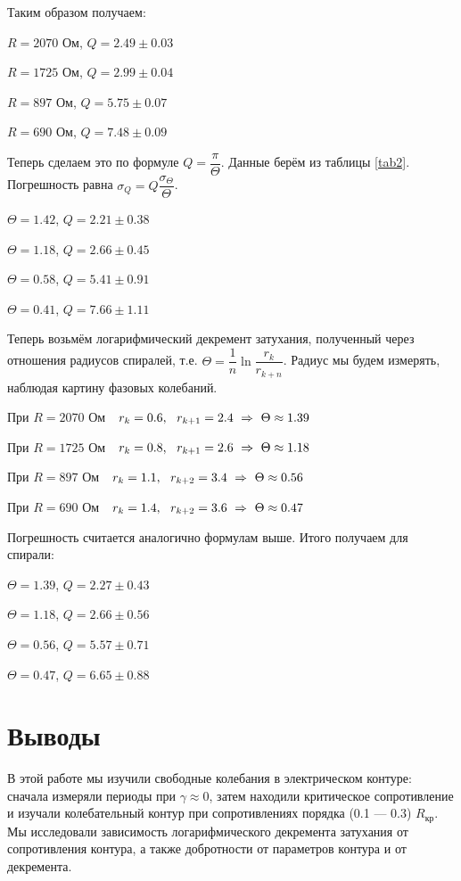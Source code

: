 \documentclass[a4paper,14pt]{article}
\begin{document}
Таким образом получаем:

\begin{center}
	$R = 2070$ Ом, \qquad $Q = 2.49 \pm 0.03$
	
	$R = 1725$ Ом, \qquad $Q = 2.99 \pm 0.04$
	
	$R = 897$ Ом, \qquad $Q = 5.75 \pm 0.07$
	
	$R = 690$ Ом, \qquad $Q = 7.48 \pm 0.09$
\end{center}

Теперь сделаем это по формуле $Q = \dfrac{\pi}{\Theta}$. Данные берём из таблицы \ref{tab2}. Погрешность равна $ \sigma_Q = Q \dfrac{\sigma_\Theta}{\Theta} $. 

\begin{center}
	$\Theta = 1.42$, \qquad $Q = 2.21 \pm 0.38$
	
	$\Theta = 1.18$, \qquad $Q = 2.66 \pm 0.45$
	
	$\Theta = 0.58$, \qquad $Q = 5.41 \pm 0.91$
	
	$\Theta = 0.41$, \qquad $Q = 7.66 \pm 1.11$
\end{center}


Теперь возьмём логарифмический декремент затухания, полученный через отношения радиусов спиралей, т.е. $ \Theta =  \dfrac{1}{n} \ln \dfrac{r_k}{r_{k+n}}$. Радиус мы будем измерять, наблюдая картину фазовых колебаний.

При $ R = 2070  $ Ом $ \ \ r_k = 0.6, \ \ r_{k+1} = 2.4 \ \Ra \ \Theta \approx 1.39$ 

При $ R = 1725  $ Ом $ \ \ r_k = 0.8, \ \ r_{k+1} = 2.6 \ \Ra \ \Theta \approx 1.18$ 

При $ R = 897  $ Ом $ \ \ r_k = 1.1, \ \ r_{k+2} = 3.4 \ \Ra \ \Theta \approx 0.56$ 

При $ R = 690  $ Ом $ \ \ r_k = 1.4, \ \ r_{k+2} = 3.6 \ \Ra \ \Theta \approx 0.47$ 

Погрешность считается аналогично формулам выше. Итого получаем для спирали:

\begin{center}
	$\Theta = 1.39$, \qquad $Q = 2.27 \pm 0.43$
	
	$\Theta = 1.18$, \qquad $Q = 2.66 \pm 0.56$
	
	$\Theta = 0.56$, \qquad $Q = 5.57 \pm 0.71$
	
	$\Theta = 0.47$, \qquad $Q = 6.65 \pm 0.88$
\end{center}


\section*{Выводы}
В этой работе мы изучили свободные колебания в электрическом контуре: сначала измеряли периоды при $ \gamma \approx 0 $, затем находили критическое сопротивление и изучали колебательный контур при сопротивлениях порядка (0.1 --- 0.3) $R_{\text{кр}}$. Мы исследовали зависимость логарифмического декремента затухания от сопротивления контура, а также добротности от параметров контура и от декремента.
\end{document}
